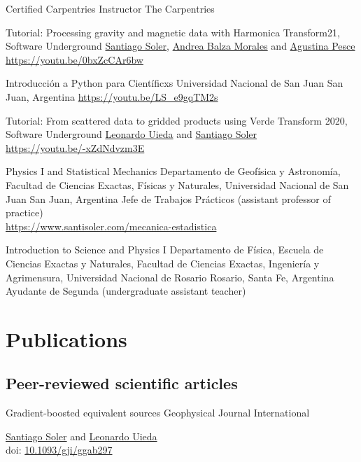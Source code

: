 \documentclass[a4paper,12pt,sans,colorlinks]{moderncv/moderncv}
\newcommand{\me}{\href{https://www.santisoler.com}{Santiago Soler}}
\newcommand{\agustina}{\href{https://aguspesce.github.io}{Agustina Pesce}}
\newcommand{\andrea}{\href{https://www.andreabalza.com/}{Andrea Balza Morales}}
\newcommand{\leo}{\href{https://www.leouieda.com}{Leonardo Uieda}}
\newcommand{\doi}[1]{%
    \href{https://doi.org/#1}{#1}
}
\begin{document}
{Certified Carpentries Instructor} %
{The Carpentries} %
{} %
{} %
{} %

{Tutorial: Processing gravity and magnetic data with Harmonica}
{Transform21, Software Underground}
{}
{}
{
    \me{}, \andrea{} and \agustina{}
    \\
    \url{https://youtu.be/0bxZcCAr6bw}
}

{Introducción a Python para Científicxs} %
{Universidad Nacional de San Juan} %
{San Juan, Argentina} %
{} %
{\url{https://youtu.be/LS_e9gqTM2s}}

{Tutorial: From scattered data to gridded products using Verde}
{Transform 2020, Software Underground}
{}
{}
{
    \leo{} and \me{}
    \\
    \url{https://youtu.be/-xZdNdvzm3E}
}

{Physics I and Statistical Mechanics}
{
    Departamento de Geofísica y Astronomía,
    Facultad de Ciencias Exactas, Físicas y Naturales,
    Universidad Nacional de San Juan
}
{San Juan, Argentina}
{}
{
    Jefe de Trabajos Prácticos (assistant professor of practice)
    \\
    \url{https://www.santisoler.com/mecanica-estadistica}
}

{Introduction to Science and Physics I}
{
    Departamento de Física,
    Escuela de Ciencias Exactas y Naturales,
    Facultad de Ciencias Exactas, Ingeniería y Agrimensura,
    Universidad Nacional de Rosario
}
{Rosario, Santa Fe, Argentina}
{}
{Ayudante de Segunda (undergraduate assistant teacher)}


\section{Publications}

\subsection{Peer-reviewed scientific articles}

{Gradient-boosted equivalent sources}
{Geophysical Journal International}
{}
{}
{
    \me{} and \leo{}
    \\
    doi: \doi{10.1093/gji/ggab297}
}
\end{document}
